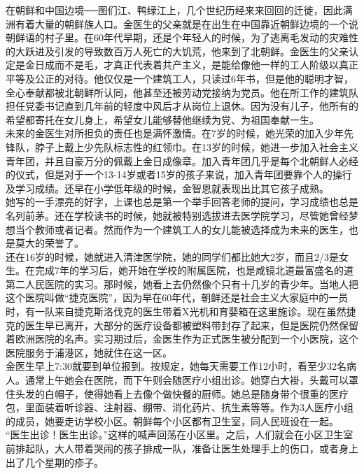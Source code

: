 在朝鲜和中国边境──图们江、鸭绿江上，几个世纪历经来来回回的迁徙，因此满洲有着大量的朝鲜族人口。金医生的父亲就是在出生在中国靠近朝鲜边境的一个说朝鲜语的村子里。在60年代早期，还是个年轻人的时候，为了逃离毛发动的灾难性的大跃进及引发的导致数百万人死亡的大饥荒，他来到了北朝鲜。金医生的父亲认定是金日成而不是毛，才真正代表着共产主义，是能给像他一样的工人阶级以真正平等及公正的对待。他仅仅是一个建筑工人，只读过6年书，但是他的聪明才智，全心奉献都被北朝鲜所认同，他甚至还被劳动党接纳为党员。他在所工作的建筑队担任党委书记直到几年前的轻度中风后才从岗位上退休。因为没有儿子，他所有的希望都寄托在女儿身上，希望女儿能够替他继续为党、为祖国奉献一生。\\

未来的金医生对所担负的责任也是满怀激情。在7岁的时候，她光荣的加入少年先锋队，脖子上戴上少先队标志性的红领巾。在13岁的时候，她进一步加入社会主义青年团，并且自豪万分的佩戴上金日成像章。加入青年团几乎是每个北朝鲜人必经的仪式，但是对于一个13-14岁或者15岁的孩子来说，加入青年团要靠个人的操行及学习成绩。还早在小学低年级的时候，金智恩就表现出比其它孩子成熟。\\

她写的一手漂亮的好字，上课也总是第一个举手回答老师的提问，学习成绩也总是名列前茅。还在学校读书的时候，她就被特别选拔进去医学院学习，尽管她曾经梦想当个教师或者记者。然而作为一个建筑工人的女儿能被选择成为未来的医生，也是莫大的荣誉了。\\

还在16岁的时候，她就进入清津医学院，她的同学们都比她大2岁，而且2/3是女生。在完成7年的学习后，她开始在学校的附属医院，也是咸镜北道最富盛名的道第二人民医院的实习。那时候，她看上去仍然像个只有十几岁的青少年。当地人把这个医院叫做“捷克医院”，因为早在60年代，朝鲜还是社会主义大家庭中的一员时，有一队来自捷克斯洛伐克的医生带着X光机和育婴箱在这里施诊。现在虽然捷克的医生早已离开，大部分的医疗设备都被塑料带封存了起来，但是医院仍然保留着欧洲医院的名声。实习期过后，金医生作为正式医生被分配到一个小医院，这个医院服务于浦港区，她就住在这一区。\\

金医生早上7:30就要到单位报到。按规定，她每天需要工作12小时，看至少32名病人。通常上午她会在医院，而下午则会随医疗小组出诊。她穿白大褂，头戴可以罩住头发的白帽子，使得她看上去像个做快餐的厨师。她总是随身带个很重的医疗包，里面装着听诊器、注射器、绷带、消化药片、抗生素等等。作为3人医疗小组的成员，她要走访学校小区。朝鲜每个小区都有卫生室，同人民班设在一起。\\

“医生出诊！医生出诊。”这样的喊声回荡在小区里。之后，人们就会在小区卫生室前排起队，大人带着哭闹的孩子排成一队，准备让医生处理手上的伤口，或者身上出了几个星期的疹子。\\

